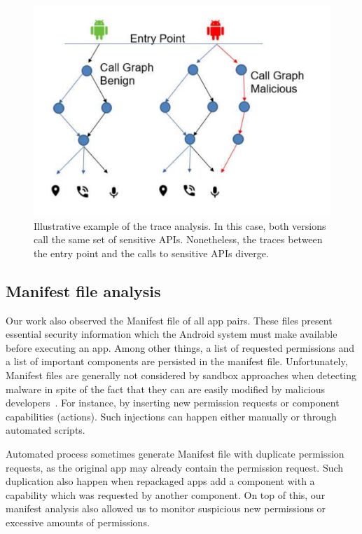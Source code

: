 \begin{figure}[ht]
\centering
\includegraphics[scale=0.25]{images/maliciousCallGraph.pdf}
\caption{Illustrative example of the trace analysis. In this case, both versions call the same set of sensitive APIs. Nonetheless,
 the traces between the entry point and the calls to sensitive APIs diverge.}
 \label{fig:callGraph}
\end{figure}


\subsection{Manifest file analysis}\label{sec:manifestAnalysis}

Our work also observed the Manifest file of all app pairs. These files present essential security information which the Android system must make available before executing an app. Among other things, a  list of requested permissions and a list of important components are persisted in the manifest file. Unfortunately, Manifest files are generally not considered by sandbox approaches when detecting malware in spite of the fact that they can are easily modified by malicious developers~\cite{DBLP:journals/corr/abs-1208-4536}. For instance, by inserting new permission requests or component capabilities (actions). Such injections can happen either manually or through automated scripts.

Automated process sometimes generate Manifest file with duplicate permission requests, as the original app may already contain the permission request. Such duplication also happen when repackaged apps add a component with a capability which was requested by another component. On top of this, our manifest analysis also allowed us to monitor suspicious new permissions or excessive amounts of permissions. 

